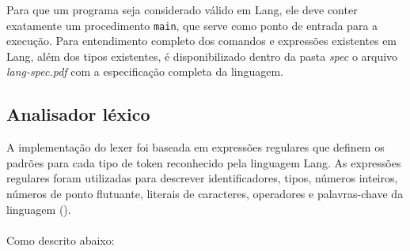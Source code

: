 \documentclass{article}
\begin{document}
Para que um programa seja considerado válido em Lang, ele deve conter exatamente um procedimento \texttt{main}, que serve como ponto de entrada para a execução. Para entendimento completo dos comandos e expressões existentes em Lang, além dos tipos existentes, é disponibilizado dentro da pasta \textit{spec} o arquivo \textit{lang-spec.pdf} com a especificação completa da linguagem.

\subsection{Analisador léxico}\label{desenvolvimento:lexer}

A implementação do lexer foi baseada em expressões regulares que definem os padrões para cada tipo de token reconhecido pela linguagem Lang. As expressões regulares foram utilizadas para descrever identificadores, tipos, números inteiros, números de ponto flutuante, literais de caracteres, operadores e palavras-chave da linguagem (\cite{aleardo2024}).
\\\\
Como descrito abaixo:
\end{document}
